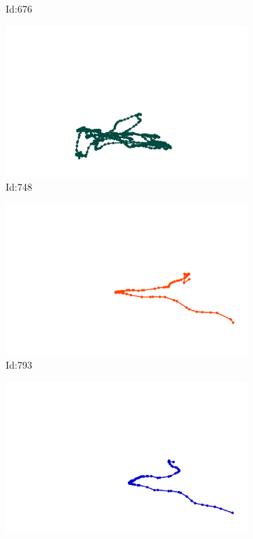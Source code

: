 \documentclass[12pt,twoside]{report}
\begin{document}
\begin{figure}
\begin{subfigure}[b]{0.20\textwidth}
\caption{Id:676}
\end{subfigure}
\begin{subfigure}[b]{0.20\textwidth}
\centering
\includegraphics[width=\textwidth]{../trajectories/748.png}
\caption{Id:748}
\end{subfigure}
\begin{subfigure}[b]{0.20\textwidth}
\centering
\includegraphics[width=\textwidth]{../trajectories/793.png}
\caption{Id:793}
\end{subfigure}
\begin{subfigure}[b]{0.20\textwidth}
\centering
\includegraphics[width=\textwidth]{../trajectories/847.png}

\end{subfigure}
\end{figure}
\end{document}
